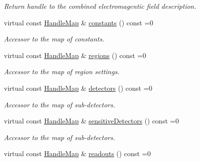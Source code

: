 \begin{DoxyCompactItemize}
\begin{DoxyCompactList}\small\item\em Return handle to the combined electromagentic field description. \item\end{DoxyCompactList}\item 
virtual const \hyperlink{class_d_d4hep_1_1_geometry_1_1_l_c_d_d_a05cb11e7355772c7b0794bcca59bf477}{HandleMap} \& \hyperlink{class_d_d4hep_1_1_geometry_1_1_l_c_d_d_a14d6ac1a5de3cd514372ab8717b6420e}{constants} () const =0
\begin{DoxyCompactList}\small\item\em Accessor to the map of constants. \item\end{DoxyCompactList}\item 
virtual const \hyperlink{class_d_d4hep_1_1_geometry_1_1_l_c_d_d_a05cb11e7355772c7b0794bcca59bf477}{HandleMap} \& \hyperlink{class_d_d4hep_1_1_geometry_1_1_l_c_d_d_ab068e5aaa1d76a2348ea74ea3d76f96f}{regions} () const =0
\begin{DoxyCompactList}\small\item\em Accessor to the map of region settings. \item\end{DoxyCompactList}\item 
virtual const \hyperlink{class_d_d4hep_1_1_geometry_1_1_l_c_d_d_a05cb11e7355772c7b0794bcca59bf477}{HandleMap} \& \hyperlink{class_d_d4hep_1_1_geometry_1_1_l_c_d_d_ad06f71146140dc2682bc586ba7bffeaf}{detectors} () const =0
\begin{DoxyCompactList}\small\item\em Accessor to the map of sub-\/detectors. \item\end{DoxyCompactList}\item 
virtual const \hyperlink{class_d_d4hep_1_1_geometry_1_1_l_c_d_d_a05cb11e7355772c7b0794bcca59bf477}{HandleMap} \& \hyperlink{class_d_d4hep_1_1_geometry_1_1_l_c_d_d_a576c24cc18698eb14658466999fca65d}{sensitiveDetectors} () const =0
\begin{DoxyCompactList}\small\item\em Accessor to the map of sub-\/detectors. \item\end{DoxyCompactList}\item 
virtual const \hyperlink{class_d_d4hep_1_1_geometry_1_1_l_c_d_d_a05cb11e7355772c7b0794bcca59bf477}{HandleMap} \& \hyperlink{class_d_d4hep_1_1_geometry_1_1_l_c_d_d_a5c815f21643ebb5cce9d1d1e71772431}{readouts} () const =0

\end{DoxyCompactItemize}
